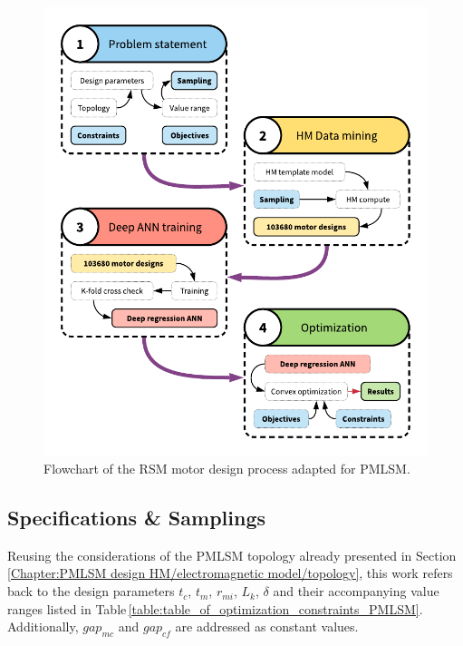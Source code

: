         
        \begin{figure}[h]
            \centering
            \includegraphics[width=4.5in]{chap4/images/optimization_process_RSM_for_PMLSM.pdf}
            \caption{Flowchart of the RSM motor design process adapted for PMLSM.}
            \label{fig:chapter/rsm/PMLSM optimization}
        \end{figure}
        
        
        \subsection{Specifications \& Samplings}    \label{Chapter:RSM/PMLSM/spec}
        
        
            Reusing the considerations of the \acs{PMLSM} topology already presented in Section\,\ref{Chapter:PMLSM design HM/electromagnetic model/topology}, this work refers back to the design parameters $t_c$, $t_m$, $r_{mi}$, $L_k$, $\delta$ and their accompanying value ranges listed in Table\,\ref{table:table_of_optimization_constraints_PMLSM}. Additionally, $gap_{mc}$ and $gap_{cf}$ are addressed as constant values. 
            
